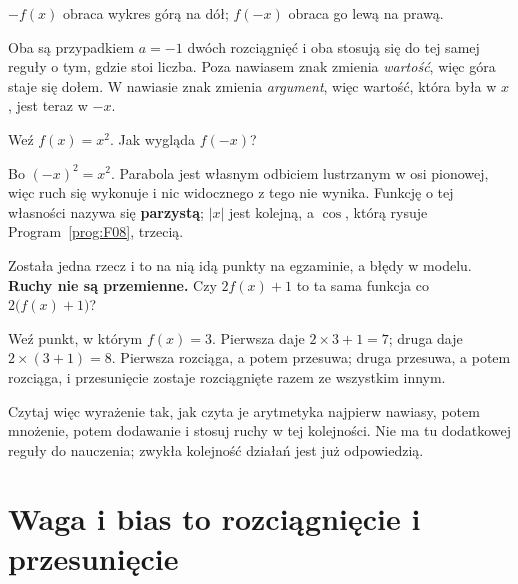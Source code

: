 \begin{fr}
\begin{ansblock}
$-f(x)$ obraca wykres górą na dół; $f(-x)$ obraca go lewą na prawą.
\end{ansblock}

Oba są przypadkiem $a = -1$ dwóch rozciągnięć i oba stosują się do tej samej
reguły o tym, gdzie stoi liczba. Poza nawiasem znak zmienia \emph{wartość},
więc góra staje się dołem. W nawiasie znak zmienia \emph{argument}, więc
wartość, która była w $x$, jest teraz w $-x$.

Weź $f(x) = x^{2}$. Jak wygląda $f(-x)$?
\nextframe
\end{fr}

\begin{fr}
Bo $(-x)^{2} = x^{2}$. Parabola jest własnym odbiciem lustrzanym w osi
pionowej, więc ruch się wykonuje i nic widocznego z tego nie wynika. Funkcję o
tej własności nazywa się \textbf{parzystą}; $\lvert x \rvert$ jest kolejną, a
$\cos$, którą rysuje Program~\ref{prog:F08}, trzecią.

Została jedna rzecz i to na nią idą punkty na egzaminie, a błędy w modelu.
\textbf{Ruchy nie są przemienne.} Czy $2f(x) + 1$ to ta sama funkcja co
$2\bigl(f(x) + 1\bigr)$?
\nextframe
\end{fr}

\begin{fr}
Weź punkt, w którym $f(x) = 3$. Pierwsza daje $2 \times 3 + 1 = 7$; druga daje
$2 \times (3 + 1) = 8$. Pierwsza rozciąga, a potem przesuwa; druga przesuwa, a
potem rozciąga, i przesunięcie zostaje rozciągnięte razem ze wszystkim innym.

Czytaj więc wyrażenie tak, jak czyta je arytmetyka \dash{} najpierw nawiasy,
potem mnożenie, potem dodawanie \dash{} i stosuj ruchy w tej kolejności. Nie ma
tu dodatkowej reguły do nauczenia; zwykła kolejność działań jest już
odpowiedzią.
\end{fr}


\section{Waga i bias to rozciągnięcie i przesunięcie}
\label{sec:F05-weight-bias}

